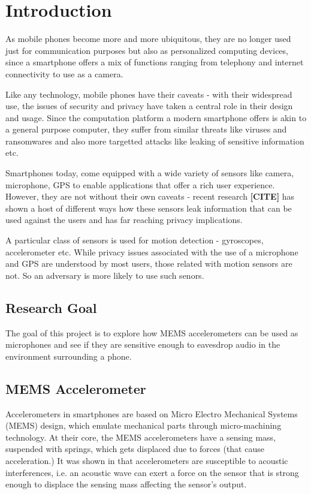 
\chapter{Introduction}

As mobile phones become more and more ubiquitous, they are no longer used just for communication purposes but also as personalized computing devices, since a smartphone offers a mix of functions ranging from telephony and internet connectivity to use as a camera.

Like any technology, mobile phones have their caveats - with their widespread use, the issues of security and privacy have taken a central role in their design and usage. Since the computation platform a modern smartphone offers is akin to a general purpose computer, they suffer from similar threats like viruses and ransomwares and also more targetted attacks like leaking of sensitive information etc.

Smartphones today, come equipped with a wide variety of sensors like camera, microphone, GPS to enable applications that offer a rich user experience. However, they are not without their own caveats - recent research
\textbf{[CITE]} has shown a host of different ways how these sensors leak information that can be used against the users and has far reaching privacy implications.

A particular class of sensors is used for motion detection - gyroscopes, accelerometer etc. While privacy issues associated with the use of a microphone and GPS are understood by most users, those related with motion sensors are not. So an adversary is more likely to use such senors.


\section{Research Goal}

\begin{adjustwidth}{1cm}{1cm}
The goal of this project is to explore how MEMS accelerometers can be used as microphones and see if they are sensitive enough to eavesdrop audio in the environment surrounding a phone.
\end{adjustwidth}

\newpage

\section{MEMS Accelerometer}
Accelerometers in smartphones are based on Micro Electro Mechanical Systems (MEMS) design, which emulate mechanical parts through micro-machining technology. At their core, the MEMS accelerometers have a sensing mass, suspended with springs, which gets displaced due to forces (that cause acceleration.) It was shown in \cite{walnut} that accelerometers are susceptible to acoustic interferences, i.e. an acoustic wave can exert a force on the sensor that is strong enough to displace the sensing mass affecting the sensor's output.


